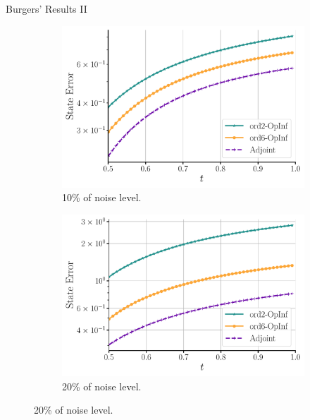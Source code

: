 \begin{frame}{Burgers' Results II}
    
\begin{figure}[h!]
  \centering
  
  \begin{subfigure}[b]{0.3\textwidth}
    \centering
    \includegraphics[width=\linewidth]{images/pred_error_vs_time_noise_10.pdf}
    \caption{10\% of noise level.}
    \label{fig:image1}
  \end{subfigure}
  \hspace{1.0cm}
  \begin{subfigure}[b]{0.3\textwidth}
    \centering
    \includegraphics[width=\linewidth]{images/pred_error_vs_time_noise_20.pdf}
    \caption{20\% of noise level.}
    \label{fig:image2}
  \end{subfigure}
  

\end{figure}
\end{frame}
